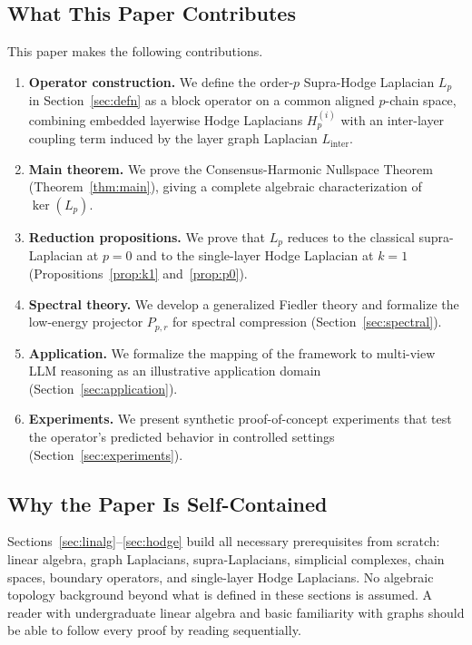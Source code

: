 \documentclass[11pt]{article}
\theoremstyle{definition}
\theoremstyle{remark}
\begin{document}
\subsection{What This Paper Contributes}
\label{subsec:contributions}

This paper makes the following contributions.
\begin{enumerate}
\item \textbf{Operator construction.} We define the order-$p$ Supra-Hodge
      Laplacian $L_p$ in Section~\ref{sec:defn} as a block operator on a common
      aligned $p$-chain space, combining embedded layerwise Hodge Laplacians
      $H_p^{(i)}$ with an inter-layer coupling term induced by the layer graph
      Laplacian $L_{\mathrm{inter}}$.
\item \textbf{Main theorem.} We prove the Consensus-Harmonic Nullspace
      Theorem (Theorem~\ref{thm:main}), giving a complete algebraic
      characterization of $\ker(L_p)$.
\item \textbf{Reduction propositions.} We prove that $L_p$ reduces to the
      classical supra-Laplacian at $p=0$ and to the single-layer Hodge
      Laplacian at $k=1$ (Propositions~\ref{prop:k1} and~\ref{prop:p0}).
\item \textbf{Spectral theory.} We develop a generalized Fiedler theory and
      formalize the low-energy projector $P_{p,r}$ for spectral compression
      (Section~\ref{sec:spectral}).
\item \textbf{Application.} We formalize the mapping of the framework to
      multi-view LLM reasoning as an illustrative application domain
      (Section~\ref{sec:application}).
\item \textbf{Experiments.} We present synthetic proof-of-concept experiments
      that test the operator's predicted behavior in controlled settings
      (Section~\ref{sec:experiments}).
\end{enumerate}

\subsection{Why the Paper Is Self-Contained}
\label{subsec:selfcontained}

Sections~\ref{sec:linalg}--\ref{sec:hodge} build all necessary prerequisites
from scratch: linear algebra, graph Laplacians, supra-Laplacians, simplicial
complexes, chain spaces, boundary operators, and single-layer Hodge Laplacians.
No algebraic topology background beyond what is defined in these sections is
assumed. A reader with undergraduate linear algebra and basic familiarity with
graphs should be able to follow every proof by reading sequentially.
\end{document}
